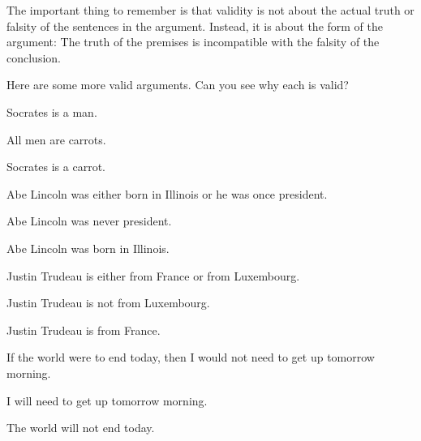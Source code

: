 The important thing to remember is that validity is not about the actual truth or falsity of the sentences in the argument. Instead, it is about the form of the argument: The truth of the premises is incompatible with the falsity of the conclusion.

Here are some more valid arguments. Can you see why each is valid?

\begin{earg}
\item Socrates is a man.
\item All men are carrots.
\item[\therefore] Socrates is a carrot.
\end{earg}


\begin{earg}
\item Abe Lincoln was either born in Illinois or he was once president.
\item Abe Lincoln was never president.
\item[\therefore] Abe Lincoln was born in Illinois.
\end{earg}

\begin{earg}
\item Justin Trudeau is either from France or from Luxembourg.
\item Justin Trudeau is not from Luxembourg.
\item[\therefore] Justin Trudeau is from France.
\end{earg}


\begin{earg}
\item If the world were to end today, then I would not need to get up tomorrow morning.
\item I will need to get up tomorrow morning.
\item[\therefore] The world will not end today.
\end{earg}



